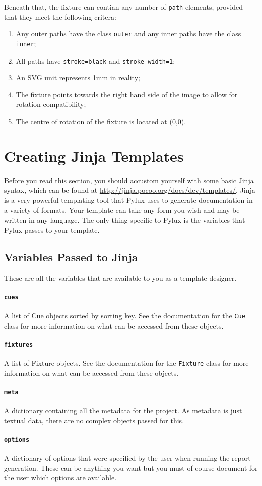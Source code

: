\documentclass[a4paper]{article}
\begin{document}
Beneath that, the fixture can contian any number of \texttt{path} elements, 
provided that they meet the following critera:
\begin{enumerate}
\item Any outer paths have the class \texttt{outer} and any inner paths have 
the class \texttt{inner};
\item All paths have \texttt{stroke=black} and \texttt{stroke-width=1};
\item An SVG unit represents 1mm in reality;
\item The fixture points towards the right hand side of the image to allow for 
rotation compatibility;
\item The centre of rotation of the fixture is located at (0,0).
\end{enumerate}

\section{Creating Jinja Templates}
Before you read this section, you should accustom yourself with some basic 
Jinja syntax, which can be found at 
\url{http://jinja.pocoo.org/docs/dev/templates/}. Jinja is a very powerful 
templating tool that Pylux uses to generate documentation in a variety of 
formats. Your template can take any form you wish and may be written in any 
language. The only thing specific to Pylux is the variables that Pylux passes 
to your template.

\subsection{Variables Passed to Jinja}
These are all the variables that are available to you as a template designer.

\paragraph{\texttt{cues}}
A list of Cue objects sorted by sorting key. See the documentation for the 
\texttt{Cue} class for more information on what can be accessed from these 
objects.

\paragraph{\texttt{fixtures}}
A list of Fixture objects. See the documentation for the \texttt{Fixture} 
class for more information on what can be accessed from these objects.

\paragraph{\texttt{meta}}
A dictionary containing all the metadata for the project. As metadata is just 
textual data, there are no complex objects passed for this.

\paragraph{\texttt{options}}
A dictionary of options that were specified by the user when running the 
report generation. These can be anything you want but you must of course 
document for the user which options are available.
\end{document}
